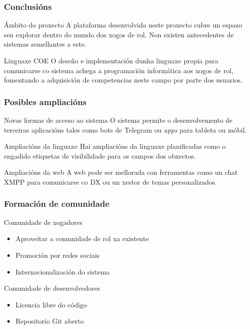 \documentclass[12pt]{beamer}
\begin{document}
\begin{frame}
\frametitle{Conclusións}
\begin{block}{Ámbito do proxecto}
A plataforma desenvolvida neste proxecto cubre un espazo sen explorar dentro do
mundo dos xogos de rol. Non existen antecedentes de sistemas semellantes a este.
\end{block}

\begin{block}{Linguaxe COE}
O deseño e implementación dunha linguaxe propia para comunicarse co sistema
achega a programación informática aos xogos de rol, fomentando a adquisición de
competencias neste campo por parte dos usuarios.
\end{block}
\end{frame}

\begin{frame}
\frametitle{Posibles ampliacións}
\begin{block}{Novas formas de acceso ao sistema}
O sistema permite o desenvolvemento de terceiras aplicacións tales como
\alert{bots de Telegram} ou \textit{apps} para tableta ou móbil.
\end{block}
\begin{block}{Ampliacións da linguaxe}
Hai ampliacións da linguaxe planificadas como o engadido etiquetas de
visibilidade para os campos dos obxectos.
\end{block}
\begin{block}{Ampliacións da web}
A web pode ser mellorada con ferramentas como un \alert{chat XMPP} para
comunicarse co DX ou un xestor de temas personalizados.
\end{block}
\end{frame}

\begin{frame}
\frametitle{Formación de comunidade}
\begin{block}{Comunidade de xogadores}
\begin{itemize}
  \item Aproveitar a comunidade de rol xa existente
  \item Promoción por redes sociais
  \item Internacionalización do sistema
\end{itemize}
\end{block}
\begin{block}{Comunidade de desenvolvedores}
\begin{itemize}
  \item Licencia libre do código
  \item Repositorio Git aberto
\end{itemize}
\end{block}
\end{frame}
\end{document}

